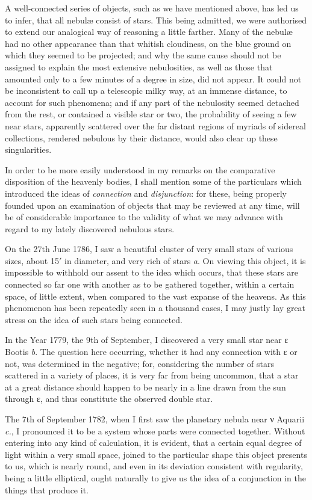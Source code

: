 \documentclass[a4paper, 12pt, oneside, polutonikogreek, english]{article}
\begin{document}
A well-connected series of objects, such as we have mentioned above, has led us to infer, that all nebulæ consist of stars. This being admitted, we were authorised to extend our analogical way of reasoning a little farther. Many of the nebulæ had no other appearance than that whitish cloudiness, on the blue ground on which they seemed to be projected; and why the same cause should not be assigned to explain the most extensive nebulosities, as well as those that amounted only to a few minutes of a degree in size, did not appear. It could not be inconsistent to call up a telescopic milky way, at an immense distance, to account for such phenomena; and if any part of the nebulosity seemed detached from the rest, or contained a visible star or two, the probability of seeing a few near stars, apparently scattered over the far distant regions of myriads of sidereal collections, rendered nebulous by their distance, would also clear up these singularities.

In order to be more easily understood in my remarks on the comparative disposition of the heavenly bodies, I shall mention some of the particulars which introduced the ideas of \emph{connection} and \emph{disjunction}: for these, being properly founded upon an examination of objects that may be reviewed at any time, will be of considerable importance to the validity of what we may advance with regard to my lately discovered nebulous stars.

On the 27th June 1786, I saw a beautiful cluster of very small stars of various sizes, about 15$\prime$ in diameter, and very rich of stars \emph{a}. On viewing this object, it is impossible to withhold our assent to the idea which occurs, that these stars are connected so far one with another as to be gathered together, within a certain space, of little extent, when compared to the vast expanse of the heavens. As this phenomenon has been repeatedly seen in a thousand cases, I may justly lay great stress on the idea of such stars being connected.

In the Year 1779, the 9th of September, I discovered a very small star near ε Bootis \emph{b}. The question here occurring, whether it had any connection with ε or not, was determined in the negative; for, considering the number of stars scattered in a variety of places, it is very far from being uncommon, that a star at a great distance should happen to be nearly in a line drawn from the sun through ε, and thus constitute the observed double star.

The 7th of September 1782, when I first saw the planetary nebula near ν Aquarii \emph{c.}, I pronounced it to be a system whose parts were connected together. Without entering into any kind of calculation, it is evident, that a certain equal degree of light within a very small space, joined to the particular shape this object presents to us, which is nearly round, and even in its deviation consistent with regularity, being a little elliptical, ought naturally to give us the idea of a conjunction in the things that produce it.
\end{document}
